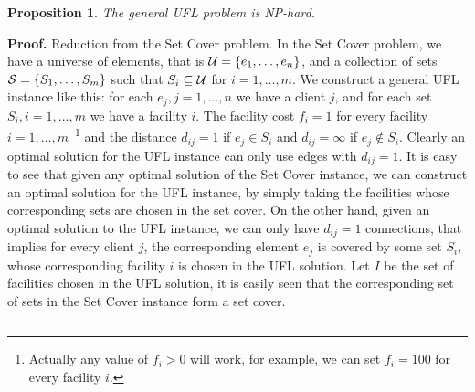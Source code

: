 \documentclass[oneside,final]{ucr}
\newtheorem{proposition}[theorem]{Proposition}
\newenvironment{proof}[1][Proof]{\textbf{#1.} }{\ \rule{0.5em}{0.5em}}
\begin{document}
\begin{proposition}
  The general UFL problem is NP-hard.
\end{proposition}
\begin{proof}
  Reduction from the Set Cover problem. In the Set Cover problem, we
  have a universe of elements, that is $\calU = \{e_1, \ldots, e_n\}$,
  and a collection of sets $\calS = \{S_1, \ldots, S_m\}$ such that
  $S_i \subseteq \calU$ for $i=1,\ldots,m$. We construct a general UFL
  instance like this: for each $e_j, j=1,\ldots,n$ we have a client
  $j$, and for each set $S_i, i=1,\ldots,m$ we have a facility
  $i$. The facility cost $f_i=1$ for every facility
  $i=1,\ldots,m$~\footnote{Actually any value of $f_i > 0$ will work, for
    example, we can set $f_i=100$ for every facility $i$.} and the
  distance $d_{ij} = 1$ if $e_j \in S_i$ and $d_{ij} = \infty$ if $e_j
  \notin S_i$. Clearly an optimal solution for the UFL instance can
  only use edges with $d_{ij} = 1$. It is easy to see that given any
  optimal solution of the Set Cover instance, we can construct an
  optimal solution for the UFL instance, by simply taking the
  facilities whose corresponding sets are chosen in the set cover. On
  the other hand, given an optimal solution to the UFL instance, we
  can only have $d_{ij}=1$ connections, that implies for every client $j$,
  the corresponding element $e_j$ is covered by some set $S_i$, whose
  corresponding facility $i$ is chosen in the UFL solution. Let $I$ be
  the set of facilities chosen in the UFL solution, it is easily seen
  that the corresponding set of sets in the Set Cover instance form a
  set cover.
\end{proof}
\end{document}

